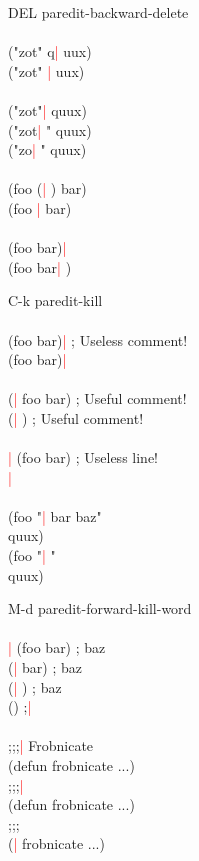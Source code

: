 \documentclass[8pt,a4paper,landscape]{extarticle}
\newcommand{\csr}{\textcolor{red}{| }}
\begin{document}
\begin{multicols}{4}
\begin{eqlist}
\item[DEL] paredit-backward-delete\\
  \\
  ("zot" q\csr uux)\\
  ("zot" \csr uux)\\
  \\
  ("zot"\csr  quux)\\
  ("zot\csr " quux)\\
  ("zo\csr " quux)\\
  \\
  (foo (\csr ) bar)\\
  (foo \csr  bar)\\
  \\
  (foo bar)\csr \\
  (foo bar\csr )\\


\item[C-k] paredit-kill\\
  \\
  (foo bar)\csr      ; Useless comment!\\
  (foo bar)\csr \\
  \\
  (\csr foo bar)     ; Useful comment!\\
  (\csr )     ; Useful comment!\\
  \\
  \csr (foo bar)     ; Useless line!\\
  \csr \\
  \\
  (foo "\csr bar baz"\\
  quux)\\
  (foo "\csr "\\
  quux)\\
\columnbreak

\item[M-d] paredit-forward-kill-word\\
  \\
  \csr (foo bar)    ; baz\\
  (\csr  bar)    ; baz\\
  (\csr )    ; baz\\
  ()    ;\csr \\
  \\
  ;;;\csr  Frobnicate\\
  (defun frobnicate ...)\\
  ;;;\csr \\
  (defun frobnicate ...)\\
  ;;;\\
  (\csr  frobnicate ...)\\



\end{eqlist}
\end{multicols}
\end{document}
